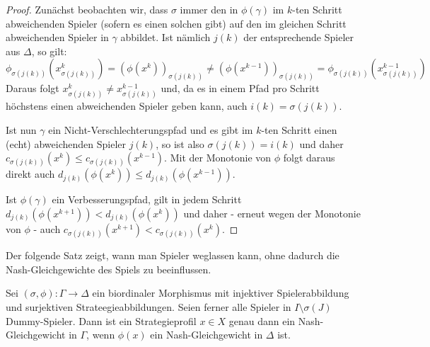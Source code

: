 \begin{proof}
	Zunächst beobachten wir, dass $\sigma$ immer den in $\phi(\gamma)$ im $k$-ten Schritt abweichenden Spieler (sofern es einen solchen gibt) auf den im gleichen Schritt abweichenden Spieler in $\gamma$ abbildet. Ist nämlich $j(k)$ der entsprechende Spieler aus $\Delta$, so gilt:
	\[\phi_{\sigma(j(k))}\left(x_{\sigma(j(k))}^k\right) = \left(\phi(x^k)\right)_{\sigma(j(k))} \neq \left(\phi(x^{k-1})\right)_{\sigma(j(k))} = \phi_{\sigma(j(k))}\left(x_{\sigma(j(k))}^{k-1}\right)\]
	Daraus folgt $x_{\sigma(j(k))}^k \neq x_{\sigma(j(k))}^{k-1}$ und, da es in einem Pfad pro Schritt höchstens einen abweichenden Spieler geben kann, auch $i(k) = \sigma(j(k))$.
	
	Ist nun $\gamma$ ein Nicht-Verschlechterungspfad und es gibt im $k$-ten Schritt einen (echt) abweichenden Spieler $j(k)$, so ist also $\sigma(j(k)) = i(k)$ und daher $c_{\sigma(j(k))}(x^k) \leq c_{\sigma(j(k))}(x^{k-1})$. Mit der Monotonie von $\phi$ folgt daraus direkt auch $d_{j(k)}(\phi(x^k)) \leq d_{j(k)}(\phi(x^{k-1}))$.
	
	Ist $\phi(\gamma)$ ein Verbesserungspfad, gilt in jedem Schritt $d_{j(k)}(\phi(x^{k+1})) < d_{j(k)}(\phi(x^k))$ und daher - erneut wegen der Monotonie von $\phi$ - auch $c_{\sigma(j(k))}(x^{k+1}) < c_{\sigma(j(k))}(x^{k})$.
\end{proof}

Der folgende Satz zeigt, wann man Spieler weglassen kann, ohne dadurch die Nash-Gleichgewichte des Spiels zu beeinflussen.

\begin{satz}\label{prop:DummySpielerWeglassen}
	Sei $(\sigma, \phi): \Gamma \to \Delta$ ein biordinaler Morphismus mit injektiver Spielerabbildung und surjektiven Strateegieabbildungen. Seien ferner alle Spieler in $I\setminus \sigma(J)$ Dummy-Spieler. Dann ist ein Strategieprofil $x \in X$ genau dann ein Nash-Gleichgewicht in $\Gamma$, wenn $\phi(x)$ ein Nash-Gleichgewicht in $\Delta$ ist.
\end{satz}


